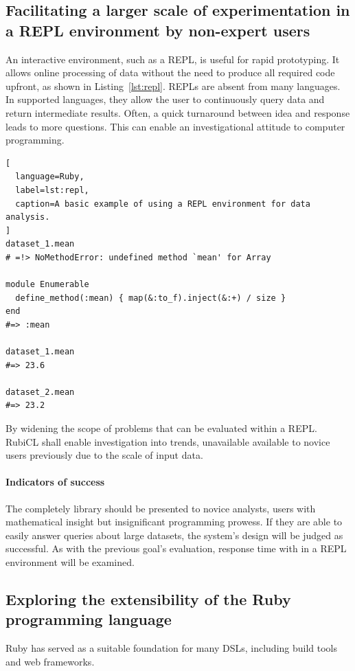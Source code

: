 \subsection{Facilitating a larger scale of experimentation in a REPL environment by non-expert users}

An interactive environment, such as a \ac{REPL}, is useful for rapid prototyping. It allows online processing of data without the need to produce all required code upfront, as shown in Listing~\ref{lst:repl}. \acp{REPL} are absent from many languages. In supported languages, they allow the user to continuously query data and return intermediate results. Often, a quick turnaround between idea and response leads to more questions. This can enable an investigational attitude to computer programming.

\begin{lstlisting}[
  language=Ruby,
  label=lst:repl,
  caption=A basic example of using a REPL environment for data analysis.
]
dataset_1.mean
# =!> NoMethodError: undefined method `mean' for Array

module Enumerable
  define_method(:mean) { map(&:to_f).inject(&:+) / size }
end
#=> :mean

dataset_1.mean
#=> 23.6

dataset_2.mean
#=> 23.2
\end{lstlisting}

By widening the scope of problems that can be evaluated within a \ac{REPL}. RubiCL shall enable investigation into trends, unavailable available to novice users previously due to the scale of input data.

\paragraph{Indicators of success}
The completely library should be presented to novice analysts, users with mathematical insight but insignificant programming prowess. If they are able to easily answer queries about large datasets, the system's design will be judged as successful. As with the previous goal's evaluation, response time with in a \ac{REPL} environment will be examined.

\subsection{Exploring the extensibility of the Ruby programming language}
Ruby has served as a suitable foundation for many \acp{DSL}, including build tools\cite{rake} and web frameworks\cite{sinatra}. 

